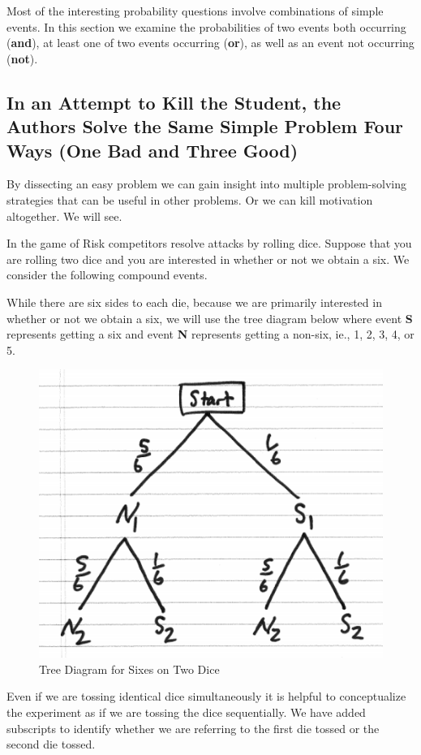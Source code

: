 \documentclass[]{book}
\theoremstyle{definition}
\theoremstyle{definition}
\theoremstyle{definition}
\theoremstyle{remark}
\begin{document}
Most of the interesting probability questions involve combinations of
simple events. In this section we examine the probabilities of two
events both occurring (\textbf{and}), at least one of two events
occurring (\textbf{or}), as well as an event not occurring
(\textbf{not}).

\subsection{In an Attempt to Kill the Student, the Authors Solve the
Same Simple Problem Four Ways (One Bad and Three
Good)}\label{kill_the_student}

By dissecting an easy problem we can gain insight into multiple
problem-solving strategies that can be useful in other problems. Or we
can kill motivation altogether. We will see.

In the game of Risk competitors resolve attacks by rolling dice. Suppose
that you are rolling two dice and you are interested in whether or not
we obtain a six. We consider the following compound events.

While there are six sides to each die, because we are primarily
interested in whether or not we obtain a six, we will use the tree
diagram below where event \textbf{S} represents getting a six and event
\textbf{N} represents getting a non-six, ie., 1, 2, 3, 4, or 5.

\begin{figure}

{\centering \includegraphics[width=0.6\linewidth]{01-basics-figures/tree_two_dice_sixes} 

}

\caption{Tree Diagram for Sixes on Two Dice}\label{fig:nice-fig-7}
\end{figure}

Even if we are tossing identical dice simultaneously it is helpful to
conceptualize the experiment as if we are tossing the dice sequentially.
We have added subscripts to identify whether we are referring to the
first die tossed or the second die tossed.
\end{document}
